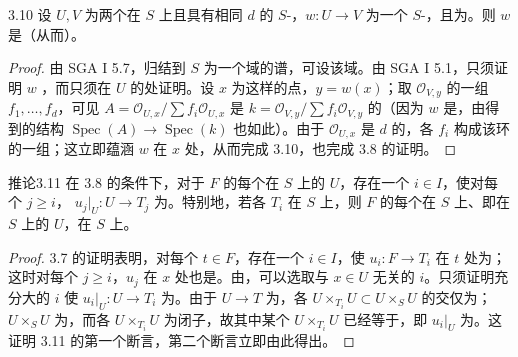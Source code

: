 \begin{SGAresult}{}{3.10}
设 $U,V$ 为两个在 $S$ 上且具有相同 $d$ 的 $S$-，$w:U\to V$ 为一个 $S$-，且为。则 $w$ 是（从而）。
\end{SGAresult}
\begin{proof}
由 SGA I 5.7，归结到 $S$ 为一个域的谱，可设该域。由 SGA I 5.1，只须证明 $w$ ，而只须在 $U$ 的处证明。设 $x$ 为这样的点，$y=w(x)$；取 $\mathscr O_{V,y}$ 的一组 $f_1,\ldots,f_d$，可见 $A=\mathscr O_{U,x}/\sum f_i\mathscr O_{U,x}$ 是 $k=\mathscr O_{V,y}/\sum f_i\mathscr O_{V,y}$ 的（因为 $w$ 是，由得到的结构 $\operatorname{Spec}(A)\to\operatorname{Spec}(k)$ 也如此）。由于 $\mathscr O_{U,x}$ 是 $d$ 的，各 $f_i$ 构成该环的一组；这立即蕴涵 $w$ 在 $x$ 处，从而完成 3.10，也完成 3.8 的证明。
\end{proof}
\begin{SGAresult}{推论}{3.11}
在 3.8 的条件下，对于 $F$ 的每个在 $S$ 上的 $U$，存在一个 $i\in I$，使对每个 $j\ge i$， $u_j|_U:U\to T_j$ 为。特别地，若各 $T_i$ 在 $S$ 上，则 $F$ 的每个在 $S$ 上、即在 $S$ 上的 $U$，在 $S$ 上。
\end{SGAresult}
\begin{proof}
3.7 的证明表明，对每个 $t\in F$，存在一个 $i\in I$，使 $u_i:F\to T_i$ 在 $t$ 处为；这时对每个 $j\ge i$，$u_j$ 在 $x$ 处也是。由，可以选取与 $x\in U$ 无关的 $i$。只须证明充分大的 $i$ 使 $u_i|_U:U\to T_i$ 为。由于 $U\to T$ 为，各 $U\times_{T_i}U\subset U\times_S U$ 的交仅为；$U\times_S U$ 为，而各 $U\times_{T_i}U$ 为闭子，故其中某个 $U\times_{T_i}U$ 已经等于，即 $u_i|_U$ 为。这证明 3.11 的第一个断言，第二个断言立即由此得出。
\end{proof}
